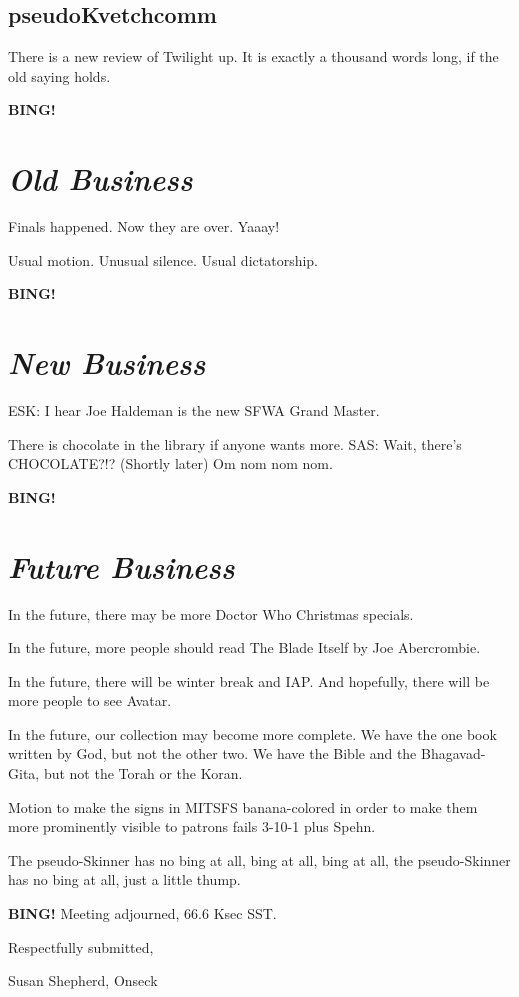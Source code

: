 \documentclass[10pt]{article}
\newcommand{\bing}{{\bf BING!} }
\newcommand{\goto}[1]{\bing \vskip 12pt \section*{{\em{#1}}}}
\newcommand{\ps}{ plus Spehn\xspace}
\newcommand{\onseck}{Susan Shepherd, Onseck}
\begin{document}
\subsection*{pseudoKvetchcomm}
There is a new review of Twilight up. It is exactly a thousand words long, if the old saying holds.

\goto{Old Business}
Finals happened. Now they are over. Yaaay! 

Usual motion. Unusual silence. Usual dictatorship.

\goto{New Business}

ESK: I hear Joe Haldeman is the new SFWA Grand Master. 

There is chocolate in the library if anyone wants more. SAS: Wait, there's CHOCOLATE?!? (Shortly later) Om nom nom nom.

\goto{Future Business}

In the future, there may be more Doctor Who Christmas specials.

In the future, more people should read The Blade Itself by Joe Abercrombie.

In the future, there will be winter break and IAP. And hopefully, there will be more people to see Avatar.

In the future, our collection may become more complete. We have the one book written by God, but not the other two. We have the Bible and the Bhagavad-Gita, but not the Torah or the Koran.

Motion to make the signs in MITSFS banana-colored in order to make them more prominently visible to patrons fails 3-10-1\ps.

The pseudo-Skinner has no bing at all, bing at all, bing at all, the pseudo-Skinner has no bing at all, just a little thump.

\bing
\noindent
Meeting adjourned, 66.6 Ksec SST.

\vspace{18pt}

\centerline{Respectfully submitted,}
\centerline{\onseck}
\end{document}
